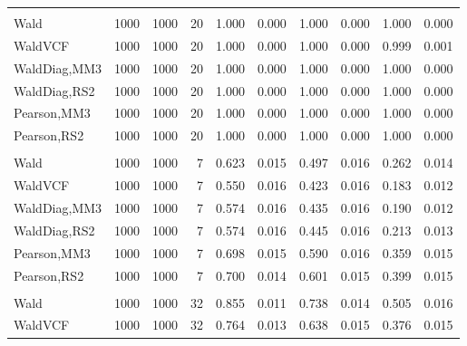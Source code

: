 \documentclass[
]{article}
\begin{document}
\begin{table}[H]
{\begin{tabular}[t]{lrrrrrrlrr}
\addlinespace[0.3em]
\multicolumn{10}{l}{\textbf{1F 15V}}\\
\hspace{1em}Wald & 1000 & 1000 & 20 & 1.000 & 0.000 & 1.000 & 0.000 & 1.000 & 0.000\\
\hspace{1em}WaldVCF & 1000 & 1000 & 20 & 1.000 & 0.000 & 1.000 & 0.000 & 0.999 & 0.001\\
\hspace{1em}WaldDiag,MM3 & 1000 & 1000 & 20 & 1.000 & 0.000 & 1.000 & 0.000 & 1.000 & 0.000\\
\hspace{1em}WaldDiag,RS2 & 1000 & 1000 & 20 & 1.000 & 0.000 & 1.000 & 0.000 & 1.000 & 0.000\\
\hspace{1em}Pearson,MM3 & 1000 & 1000 & 20 & 1.000 & 0.000 & 1.000 & 0.000 & 1.000 & 0.000\\
\hspace{1em}Pearson,RS2 & 1000 & 1000 & 20 & 1.000 & 0.000 & 1.000 & 0.000 & 1.000 & 0.000\\
\addlinespace[0.3em]
\multicolumn{10}{l}{\textbf{2F 10V}}\\
\hspace{1em}Wald & 1000 & 1000 & 7 & 0.623 & 0.015 & 0.497 & 0.016 & 0.262 & 0.014\\
\hspace{1em}WaldVCF & 1000 & 1000 & 7 & 0.550 & 0.016 & 0.423 & 0.016 & 0.183 & 0.012\\
\hspace{1em}WaldDiag,MM3 & 1000 & 1000 & 7 & 0.574 & 0.016 & 0.435 & 0.016 & 0.190 & 0.012\\
\hspace{1em}WaldDiag,RS2 & 1000 & 1000 & 7 & 0.574 & 0.016 & 0.445 & 0.016 & 0.213 & 0.013\\
\hspace{1em}Pearson,MM3 & 1000 & 1000 & 7 & 0.698 & 0.015 & 0.590 & 0.016 & 0.359 & 0.015\\
\hspace{1em}Pearson,RS2 & 1000 & 1000 & 7 & 0.700 & 0.014 & 0.601 & 0.015 & 0.399 & 0.015\\
\addlinespace[0.3em]
\multicolumn{10}{l}{\textbf{3F 15V}}\\
\hspace{1em}Wald & 1000 & 1000 & 32 & 0.855 & 0.011 & 0.738 & 0.014 & 0.505 & 0.016\\
\hspace{1em}WaldVCF & 1000 & 1000 & 32 & 0.764 & 0.013 & 0.638 & 0.015 & 0.376 & 0.015\\

\end{tabular}}
\end{table}
\end{document}
